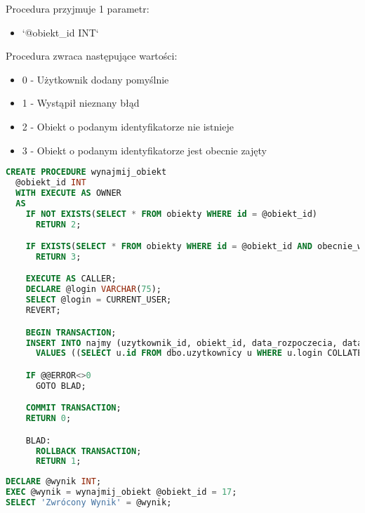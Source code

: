 Procedura przyjmuje 1 parametr:
\begin{itemize}
	\item `@obiekt_id INT`
\end{itemize}

Procedura zwraca następujące wartości:
\begin{itemize}
	\item 0 - Użytkownik dodany pomyślnie
	\item 1 - Wystąpił nieznany błąd
	\item 2 - Obiekt o podanym identyfikatorze nie istnieje
	\item 3 - Obiekt o podanym identyfikatorze jest obecnie zajęty
\end{itemize}

\begin{lstlisting}[language=SQL, caption={Skrypt tworzący procedurę składowaną \texttt{wynajmij\_obiekt}}, label={lst:procedura-wynajmij_obiekt}]
CREATE PROCEDURE wynajmij_obiekt
  @obiekt_id INT
  WITH EXECUTE AS OWNER
  AS
    IF NOT EXISTS(SELECT * FROM obiekty WHERE id = @obiekt_id)
      RETURN 2;

    IF EXISTS(SELECT * FROM obiekty WHERE id = @obiekt_id AND obecnie_wynajete = 't')
      RETURN 3;

    EXECUTE AS CALLER;
    DECLARE @login VARCHAR(75);
    SELECT @login = CURRENT_USER;
    REVERT;

    BEGIN TRANSACTION;
    INSERT INTO najmy (uzytkownik_id, obiekt_id, data_rozpoczecia, data_zakonczenia, koszt)
      VALUES ((SELECT u.id FROM dbo.uzytkownicy u WHERE u.login COLLATE SQL_Latin1_General_CP1_CS_AS = @login COLLATE SQL_Latin1_General_CP1_CS_AS), @obiekt_id, DEFAULT, NULL, NULL);

    IF @@ERROR<>0
      GOTO BLAD;

    COMMIT TRANSACTION;
    RETURN 0;

    BLAD:
      ROLLBACK TRANSACTION;
      RETURN 1;
\end{lstlisting}

\begin{lstlisting}[language=SQL, caption={Przykład użycia procedury \texttt{wynajmij\_obiekt}}, label={lst:procedura-wynajmij_obiekt-przyklad}]
DECLARE @wynik INT;
EXEC @wynik = wynajmij_obiekt @obiekt_id = 17;
SELECT 'Zwrócony Wynik' = @wynik;
\end{lstlisting}